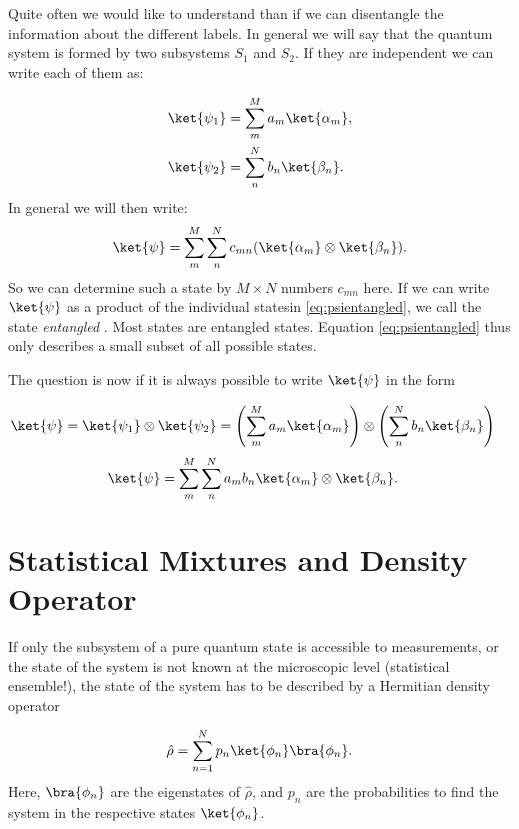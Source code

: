  Quite often we would like to understand than if we can disentangle the information about the different labels. In general we will say that the quantum system is formed by two subsystems $S_1$ and $S_2$. If they are independent we can write each of them as:

\begin{align}
				\ket{\psi_1}&=\sum_m^M a_m \ket{\alpha_m},\\
				\ket{\psi_2}&=\sum_n^N b_n \ket{\beta_n}.
			
\end{align}
In general we will then write:
\begin{align}
\ket{\psi}=\sum_m^M \sum_n^N c_{mn}(\ket{\alpha_m}\otimes \ket{\beta_n}).
\end{align}
So we can determine such a state by $M \times N$ numbers $c_{mn}$ here.  If we can write $\ket{\psi}$ as a product of the individual statesin \eqref{eq:psientangled}, we call the state \emph{entangled} . Most states are entangled states. Equation \eqref{eq:psientangled} thus only describes a small subset of all possible states.


The question is now if it is always possible to write $\ket{\psi}$ in the form

\begin{align}
 \label{eq:psientangled} 
	\ket{\psi}	&=\ket{\psi_1}\otimes\ket{\psi_2}=\left(\sum_m^M a_m \ket{\alpha_m}\right) \otimes \left(\sum_n^N b_n \ket{\beta_n}\right)
\end{align}
\begin{align}
\ket{\psi}	&=\sum_m^M \sum_n^N a_m b_n \ket{\alpha_m} \otimes \ket{\beta_n}. \label{eq:psientangled3} 
\end{align}




\section{Statistical Mixtures and Density Operator}

If only the subsystem of a pure quantum state is accessible to measurements, or the state of the system is not known at the microscopic level (statistical ensemble!), the state of the system has to be described by a Hermitian density operator

\begin{align}
 \hat{\rho} = \sum_{n=1}^N p_n \ket{\phi_n}\bra{\phi_n}.
\end{align}
Here, $\bra{\phi_n}$ are the eigenstates of $\hat{\rho}$, and $p_n$ are the probabilities to find the system in the respective states $\ket{\phi_n}$.

